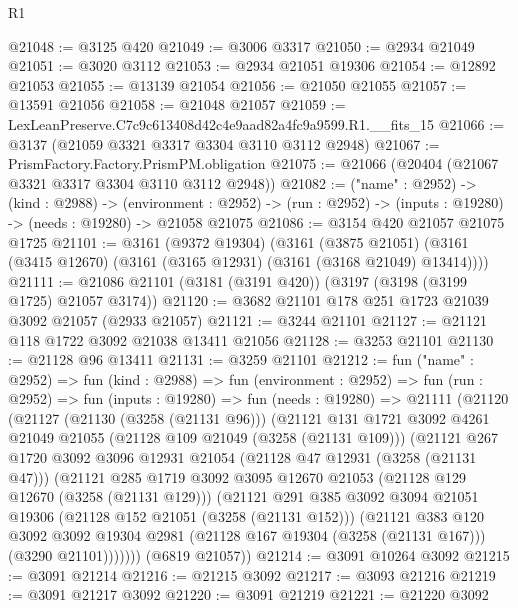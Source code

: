 \begin{lexlean}{R1}
\begin{coremodule}
@21048 := @3125 @420
@21049 := @3006 @3317
@21050 := @2934 @21049
@21051 := @3020 @3112
@21053 := @2934 @21051 @19306
@21054 := @12892 @21053
@21055 := @13139 @21054
@21056 := @21050 @21055
@21057 := @13591 @21056
@21058 := @21048 @21057
@21059 := LexLeanPreserve.C7c9c613408d42c4e9aad82a4fc9a9599.R1.__fits_15
@21066 := @3137 (@21059 @3321 @3317 @3304 @3110 @3112 @2948)
@21067 := PrismFactory.Factory.PrismPM.obligation
@21075 := @21066 (@20404 (@21067 @3321 @3317 @3304 @3110 @3112 @2948))
@21082 := ("name" : @2952) ->
  (kind : @2988) ->
  (environment : @2952) -> (run : @2952) -> (inputs : @19280) -> (needs : @19280) -> @21058 @21075
@21086 := @3154 @420 @21057 @21075 @1725
@21101 := @3161
    (@9372 @19304)
    (@3161
      (@3875 @21051)
      (@3161 (@3415 @12670) (@3161 (@3165 @12931) (@3161 (@3168 @21049) @13414))))
@21111 := @21086 @21101 (@3181 (@3191 @420)) (@3197 (@3198 (@3199 @1725) @21057 @3174))
@21120 := @3682 @21101 @178 @251 @1723 @21039 @3092 @21057 (@2933 @21057)
@21121 := @3244 @21101
@21127 := @21121 @118 @1722 @3092 @21038 @13411 @21056
@21128 := @3253 @21101
@21130 := @21128 @96 @13411
@21131 := @3259 @21101
@21212 := fun ("name" : @2952) =>
  fun (kind : @2988) =>
  fun (environment : @2952) =>
  fun (run : @2952) =>
  fun (inputs : @19280) =>
  fun (needs : @19280) =>
  @21111
    (@21120
      (@21127
        (@21130 (@3258 (@21131 @96)))
        (@21121
          @131
          @1721
          @3092
          @4261
          @21049
          @21055
          (@21128 @109 @21049 (@3258 (@21131 @109)))
          (@21121
            @267
            @1720
            @3092
            @3096
            @12931
            @21054
            (@21128 @47 @12931 (@3258 (@21131 @47)))
            (@21121
              @285
              @1719
              @3092
              @3095
              @12670
              @21053
              (@21128 @129 @12670 (@3258 (@21131 @129)))
              (@21121
                @291
                @385
                @3092
                @3094
                @21051
                @19306
                (@21128 @152 @21051 (@3258 (@21131 @152)))
                (@21121
                  @383
                  @120
                  @3092
                  @3092
                  @19304
                  @2981
                  (@21128 @167 @19304 (@3258 (@21131 @167)))
                  (@3290 @21101)))))))
      (@6819 @21057))
@21214 := @3091 @10264 @3092
@21215 := @3091 @21214
@21216 := @21215 @3092
@21217 := @3093 @21216
@21219 := @3091 @21217 @3092
@21220 := @3091 @21219
@21221 := @21220 @3092

\end{coremodule}
\end{lexlean}
